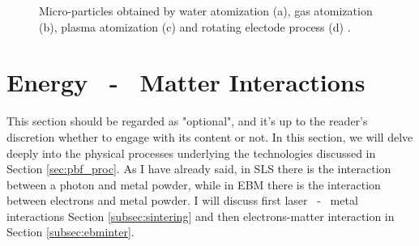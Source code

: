 \begin{figure}
{    }
    \qquad
    
    \caption[Powders from atomization processes]{Micro-particles obtained by water atomization (a), gas atomization (b), plasma atomization (c) and rotating electode process (d) \cite{slotwinski_characterization_2014}.}
    \label{fig:powders}
\end{figure}


\section{Energy ~- ~Matter Interactions}
\label{sec:matterint}
This section should be regarded as "optional", and it's up to the reader's discretion whether to engage with its content or not. In this section, we will delve deeply into the physical processes underlying the technologies discussed in Section \ref{sec:pbf_proc}. As I have already said, in SLS there is the interaction between a photon and metal powder, while in EBM there is the interaction between electrons and metal powder. I will discuss first laser ~- ~metal interactions Section \ref{subsec:sintering} and then electrons-matter interaction in Section \ref{subsec:ebminter}.

